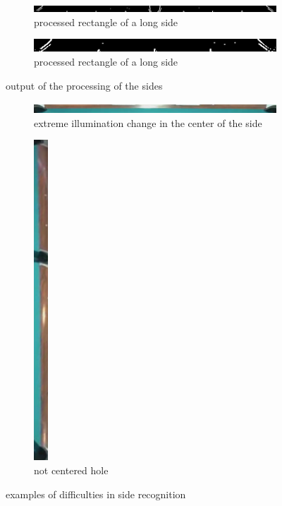 \begin{figure}
    \centering
    \begin{subfigure}[b]{\textwidth}
    \includegraphics[width=\textwidth]{./imgs/sobel_long_side.png}
    \caption{processed rectangle of a long side}\par
    \end{subfigure}\vspace{10pt}
    \begin{subfigure}[b]{\textwidth}
    \includegraphics[width=\textwidth]{./imgs/sobel_short_side.png}
    \caption{processed rectangle of a long side}
    \end{subfigure}
    \caption{output of the processing of the sides}
    \label{fig:sidestabol}
\end{figure}
\begin{figure}
    \centering
    \begin{subfigure}[b]{\textwidth}
    \includegraphics[width=\textwidth]{./imgs/bad_side_illumination_change.png}
    \caption{extreme illumination change in the  center of the side}\par
    \end{subfigure}\vspace{10pt}
    \begin{subfigure}[b]{\textwidth}
    \includegraphics[length=\textwidth, angle=90]{./imgs/bad_side_warp.png}
    \caption{not centered hole}
    \end{subfigure}
    \caption{examples of difficulties in side recognition}
    \label{fig:difficultside}
\end{figure}
